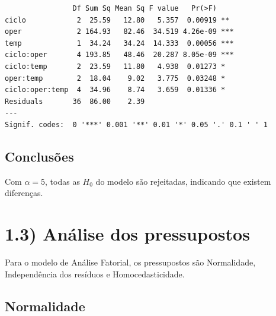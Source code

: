 \documentclass[
  letterpaper,
  DIV=11,
  numbers=noendperiod]{scrartcl}
\newenvironment{Shaded}{\begin{snugshade}}{\end{snugshade}}
\newcommand{\FunctionTok}[1]{\textcolor[rgb]{0.28,0.35,0.67}{#1}}
\newcommand{\NormalTok}[1]{\textcolor[rgb]{0.00,0.23,0.31}{#1}}
\newcommand{\SpecialCharTok}[1]{\textcolor[rgb]{0.37,0.37,0.37}{#1}}
\begin{document}
\begin{verbatim}
                Df Sum Sq Mean Sq F value   Pr(>F)    
ciclo            2  25.59   12.80   5.357  0.00919 ** 
oper             2 164.93   82.46  34.519 4.26e-09 ***
temp             1  34.24   34.24  14.333  0.00056 ***
ciclo:oper       4 193.85   48.46  20.287 8.05e-09 ***
ciclo:temp       2  23.59   11.80   4.938  0.01273 *  
oper:temp        2  18.04    9.02   3.775  0.03248 *  
ciclo:oper:temp  4  34.96    8.74   3.659  0.01336 *  
Residuals       36  86.00    2.39                     
---
Signif. codes:  0 '***' 0.001 '**' 0.01 '*' 0.05 '.' 0.1 ' ' 1
\end{verbatim}

\hypertarget{conclusuxf5es}{%
\subsection{Conclusões}\label{conclusuxf5es}}

Com \(\alpha=5%
\), todas as \(H_{0}\) do modelo são rejeitadas, indicando que existem
diferenças.

\hypertarget{anuxe1lise-dos-pressupostos}{%
\section{1.3) Análise dos
pressupostos}\label{anuxe1lise-dos-pressupostos}}

Para o modelo de Análise Fatorial, os pressupostos são Normalidade,
Independência dos resíduos e Homocedasticidade.

\hypertarget{normalidade}{%
\subsection{Normalidade}\label{normalidade}}

\begin{Shaded}
\end{Shaded}
\end{document}
